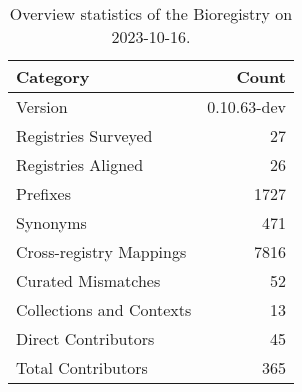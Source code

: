 \begin{table}
\caption{Overview statistics of the Bioregistry on 2023-10-16.}
\label{tab:bioregistry-summary}
\begin{tabular}{lr}
\toprule
Category & Count \\
\midrule
Version & 0.10.63-dev \\
Registries Surveyed & 27 \\
Registries Aligned & 26 \\
Prefixes & 1727 \\
Synonyms & 471 \\
Cross-registry Mappings & 7816 \\
Curated Mismatches & 52 \\
Collections and Contexts & 13 \\
Direct Contributors & 45 \\
Total Contributors & 365 \\
\bottomrule
\end{tabular}
\end{table}
